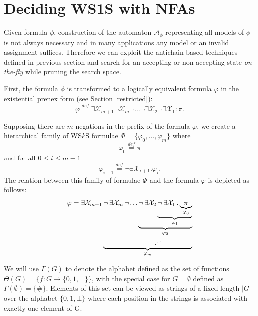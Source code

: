 \section{Deciding WS1S with NFAs}

Given formula $\phi$, construction of the automaton $\mathcal{A}_\phi$
representing all models of $\phi$ is not always necessary and in many
applications any model or an invalid assignment suffices.
Therefore we can exploit the antichain-based techniques defined in previous
section and search for an accepting or non-accepting state \emph{on-the-fly}
while pruning the search space.

First, the formula $\phi$ is transformed to a logically equivalent formula
$\varphi$ in the existential prenex form (see Section \ref{restricted}):
\begin{equation*}
 \varphi \overset{\mathit{def}}{=}
 \exists\mathcal{X}_{m+1}\neg\mathcal{X}_m\neg\ldots\neg\exists\mathcal{X}_2\neg\exists\mathcal{X}_1
 :
 \pi.
\end{equation*}

Supposing there are $m$	negations in the prefix of the formula $\varphi$, we
create a hierarchical family of WS$k$S formulae $\Phi = \{\varphi_0,\ldots,\varphi_m\}$
where
\begin{equation}
  \varphi_0 \overset{\mathit{def}}{=} \pi
\end{equation}
and for all $0 \leq i \leq m-1$
\begin{equation}
 \varphi_{i+1} \overset{\mathit{def}}{=} \neg\exists\mathcal{X}_{i+1}.
 \varphi_i.
\end{equation}
The relation between this family of formulae $\Phi$ and the formula $\varphi$ is
depicted as follows:
\begin{equation}
\begin{aligned}
\varphi = \exists \mathcal{X}_{m+1}\,
\underset{\varphi_m}{\underbrace{
  \neg\,\exists \mathcal{X}_m\,
  \neg
  \underset{\hspace{-3mm}\iddots}{
    \dots 
    \underset{\varphi_2}{\underbrace{
      \neg \,\exists \mathcal{X}_2\,
      \underset{\varphi_1}{\underbrace{
        \neg \,\exists \mathcal{X}_1\,.\,
        \underset{\varphi_0}{\underbrace{
          \pi
        }}
      }}
    }}
  }
}}
\end{aligned}
\end{equation}

We will use $\Gamma(G)$ to denote the alphabet defined as the
set of functions $\Theta(G) = \{f : G \rightarrow \{0, 1, \bot\}\}$, with the
special case for $G = \emptyset$ defined as $\Gamma(\emptyset) = \{\#\}$. Elements of this set can
be viewed as strings of a fixed length $|G|$ over the alphabet $\{0, 1, \bot\}$
where each position in the strings is associated with exactly one element of G.

